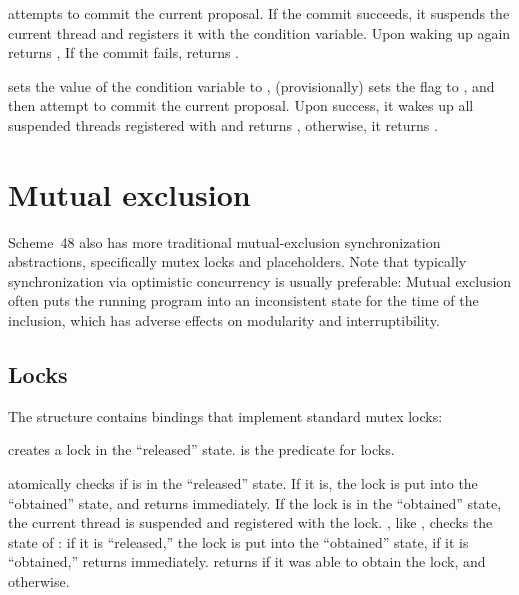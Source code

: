  attempts to commit the
current proposal.  If the commit succeeds, it suspends the current
thread and registers it with the  condition variable.
Upon waking up again  returns
, If the commit fails, 
returns .

 sets the value of the
 condition variable to , (provisionally)
sets the  flag to , and then attempt to
commit the current proposal.  Upon success, it wakes up all suspended
threads registered with  and returns ,
otherwise, it returns .

\section{Mutual exclusion}

Scheme~48 also has more traditional mutual-exclusion synchronization
abstractions, specifically mutex locks and placeholders.  Note that
typically synchronization via optimistic concurrency is usually
preferable: Mutual exclusion often puts the running program into an
inconsistent state for the time of the inclusion, which has adverse
effects on modularity and interruptibility.

\subsection{Locks}

The  structure contains bindings that implement standard
mutex locks:
%
\begin{protos}
\end{protos}
%
 creates a lock in the ``released'' state.
 is the predicate for locks.

 atomically checks if  is in the
``released'' state.  If it is, the lock is put into the ``obtained''
state, and  returns immediately.  If the lock is in
the ``obtained'' state, the current thread is suspended and registered
with the lock.
, like , checks the state of
: if it is ``released,'' the lock is put into the
``obtained'' state, if it is ``obtained,'' 
returns immediately.   returns  if
it was able to obtain the lock, and  otherwise.

